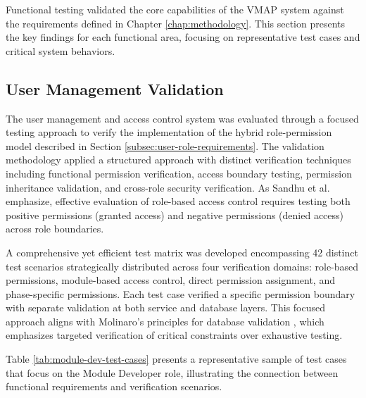 Functional testing validated the core capabilities of the VMAP system against the requirements defined in Chapter \ref{chap:methodology}. This section presents the key findings for each functional area, focusing on representative test cases and critical system behaviors.

\subsection{User Management Validation}
\label{subsec:user-management-validation}

The user management and access control system was evaluated through a focused testing approach to verify the implementation of the hybrid role-permission model described in Section \ref{subsec:user-role-requirements}. The validation methodology applied a structured approach with distinct verification techniques including functional permission verification, access boundary testing, permission inheritance validation, and cross-role security verification. As Sandhu et al. \cite{sandhu1998role} emphasize, effective evaluation of role-based access control requires testing both positive permissions (granted access) and negative permissions (denied access) across role boundaries.

A comprehensive yet efficient test matrix was developed encompassing 42 distinct test scenarios strategically distributed across four verification domains: role-based permissions, module-based access control, direct permission assignment, and phase-specific permissions. Each test case verified a specific permission boundary with separate validation at both service and database layers. This focused approach aligns with Molinaro's principles for database validation \cite{molinaro2005sql}, which emphasizes targeted verification of critical constraints over exhaustive testing.

Table \ref{tab:module-dev-test-cases} presents a representative sample of test cases that focus on the Module Developer role, illustrating the connection between functional requirements and verification scenarios.

